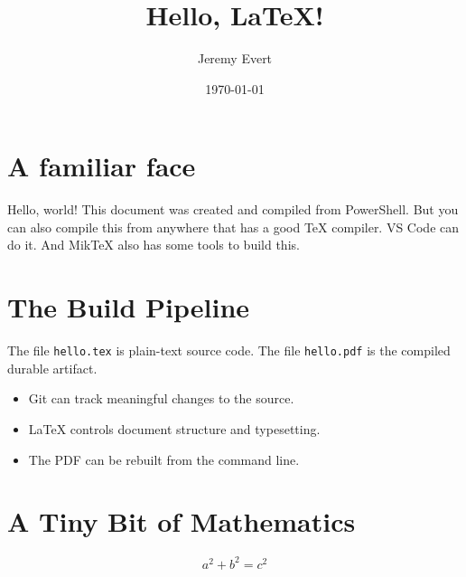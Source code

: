 \documentclass[12pt]{article}
\title{Hello, LaTeX!}
\author{Jeremy Evert}
\date{\today}
\begin{document}
\maketitle

\section{A familiar face}

Hello, world! 
This document was created and compiled from PowerShell.
But you can also compile this from anywhere that has a good TeX compiler.
VS Code can do it.
And MikTeX also has some tools to build this.

\section{The Build Pipeline}

The file \texttt{hello.tex} is plain-text source code. The file
\texttt{hello.pdf} is the compiled durable artifact.

\begin{itemize}
    \item Git can track meaningful changes to the source.
    \item LaTeX controls document structure and typesetting.
    \item The PDF can be rebuilt from the command line.
\end{itemize}

\section{A Tiny Bit of Mathematics}

\[
    a^2 + b^2 = c^2
\]
\end{document}
